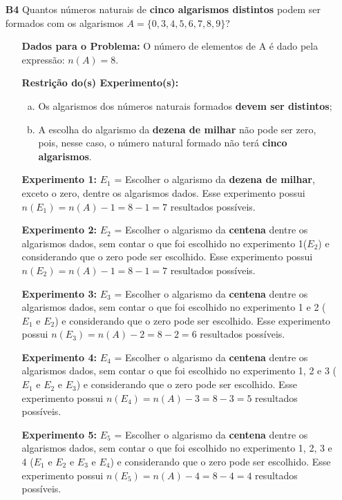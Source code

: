 \documentclass[a4paper,12pt]{article}
\begin{document}
\begin{enumerate}
\item[\textbf{B4}] Quantos números naturais de \textbf{cinco algarismos distintos} podem ser formados com os algarismos $A = \{0, 3, 4, 5, 6, 7, 8, 9\}$?
 \begin{itemize}
     \item[\ding{172}] \textbf{Dados para o Problema:} O número de elementos de A é dado pela expressão: $n(A)= 8$.
     \item[\ding{173}] \textbf{Restrição do(s) Experimento(s):}
        \begin{enumerate}[a)]
          \item Os algarismos dos números naturais formados \textbf{devem ser distintos};
          \item A escolha do algarismo da \textbf{dezena de milhar} não pode ser zero, pois, nesse caso, o número natural formado não terá \textbf{cinco algarismos}.
        \end{enumerate}
     \item[\ding{174}] \textbf{Experimento 1:} $E_1$ = Escolher o algarismo da \textbf{dezena de milhar}, exceto o zero, dentre os algarismos dados. Esse experimento possui $n(E_1) = n(A) - 1 = 8 - 1 = 7$ resultados possíveis.
     \item[\ding{175}] \textbf{Experimento 2:} $E_2$ = Escolher o algarismo da \textbf{centena} dentre os algarismos dados, sem contar o que foi escolhido no experimento 1($E_2$) e considerando que o zero pode ser escolhido. Esse experimento possui $n(E_2) = n(A) - 1 = 8 - 1 = 7$ resultados possíveis.
     \item[\ding{175}] \textbf{Experimento 3:} $E_3$ = Escolher o algarismo da \textbf{centena} dentre os algarismos dados, sem contar o que foi escolhido no experimento 1 e 2 ($E_1 \textrm{ e } E_2$) e considerando que o zero pode ser escolhido. Esse experimento possui $n(E_3) = n(A) - 2 = 8 - 2 = 6$ resultados possíveis.     
     \item[\ding{175}] \textbf{Experimento 4:} $E_4$ = Escolher o algarismo da \textbf{centena} dentre os algarismos dados, sem contar o que foi escolhido no experimento 1, 2 e 3 ($E_1 \textrm{ e } E_2 \textrm{ e } E_3$) e considerando que o zero pode ser escolhido. Esse experimento possui $n(E_4) = n(A) - 3 = 8 - 3 = 5$ resultados possíveis.
     \item[\ding{175}] \textbf{Experimento 5:} $E_5$ = Escolher o algarismo da \textbf{centena} dentre os algarismos dados, sem contar o que foi escolhido no experimento 1, 2, 3 e 4 ($E_1 \textrm{ e } E_2 \textrm{ e } E_3 \textrm{ e } E_4$) e considerando que o zero pode ser escolhido. Esse experimento possui $n(E_5) = n(A) - 4 = 8 - 4 = 4$ resultados possíveis.       

\end{itemize}
\end{enumerate}
\end{document}
